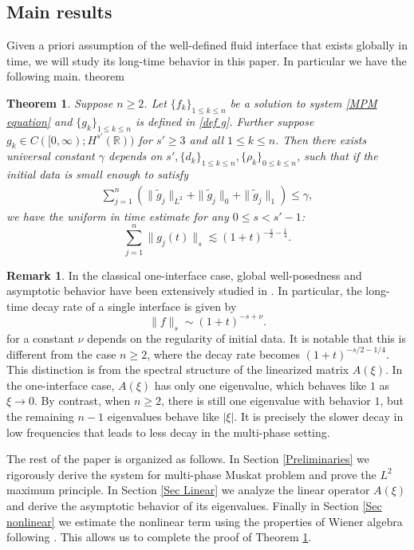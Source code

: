 \documentclass[11pt]{article}
\newtheorem{theorem}{Theorem}[section]
\theoremstyle{definition}
\newtheorem{remark}{Remark}[section]
\numberwithin{equation}{section}
\begin{document}
\subsection{Main results}
Given a priori assumption of the well-defined fluid interface that exists globally in time, we will study its long-time
behavior in this paper. In particular we have the following main. theorem
\begin{theorem}\label{theorem main}
    Suppose $n\geq 2$. Let $\{f_k\}_{1\leq k\leq n}$ be a solution to system \eqref{MPM equation} and $\{g_k\}_{1\leq k\leq n}$ is defined in \eqref{def g}. Further suppose $g_k\in C([0,\infty);H^{s'}(\mathbb{R}))$ for $s'\geq3$ and all $1\leq k\leq n$. Then there exists universal constant $\gamma$ depends on $s',\{d_k\}_{1\leq k\leq n},\{\rho_k\}_{0\leq k\leq n}$, such that if the initial data is small enough to satisfy
    \begin{align}       \sum_{j=1}^{n}\left(\|\tilde{g}_j\|_{L^2}+\|\tilde{g}_j\|_0+\|\tilde{g}_j\|_1\right)\leq\gamma,
    \end{align}
     we have the uniform in time estimate for any $0\leq s<s'-1$:
     \begin{equation}
         \sum_{j=1}^n\|g_j(t)\|_s\lesssim(1+t)^{-\frac{s}{2}-\frac{1}{4}}.
     \end{equation}
\end{theorem}
\begin{remark}
    In the classical one-interface case, global well-posedness and asymptotic behavior have been extensively studied in \cite{Patel03062017}. In particular, the long-time decay rate of a single interface  is given by
    \begin{equation}
        \|f\|_s\sim (1+t)^{-s+\nu}.
    \end{equation}
    for a constant $\nu$ depends on the regularity of initial data. It is notable that this is different from the case \(n\geq 2\), where the decay rate becomes $(1+t)^{-s/2-1/4}$. This distinction is from the spectral structure of the linearized matrix $A(\xi)$. In the one-interface case, \(A(\xi)\) has only one eigenvalue, which behaves like \(1\) as \(\xi\to 0\). By contrast, when \(n\geq 2\), there is still one eigenvalue with behavior \(1\), but the remaining \(n-1\) eigenvalues behave like \(|\xi|\). It is precisely the slower decay in low frequencies that leads to less decay in the multi-phase setting.
\end{remark}
The rest of the paper is organized as follows. In Section \ref{Preliminaries} we rigorously derive the system for multi-phase Muskat problem and prove the $L^2$ maximum principle. In Section \ref{Sec Linear} we analyze the linear operator $A(\xi)$ and derive the asymptotic behavior of its eigenvalues. Finally in Section \ref{Sec nonlinear} we estimate the nonlinear term using the properties of Wiener algebra following \cite{CCG13}. This allows us to complete the proof of Theorem \ref{theorem main}.
\end{document}
